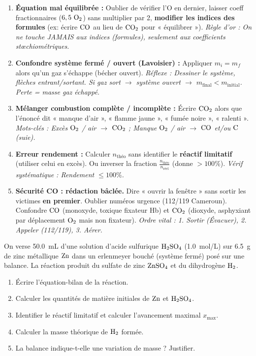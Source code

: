\documentclass[11pt]{article}
\begin{document}
\begin{attention}
\begin{enumerate}
    \item \textbf{Équation mal équilibrée :} Oublier de vérifier l'O en dernier, laisser coeff fractionnaires ($6,5~\ce{O2}$) sans multiplier par 2, \textbf{modifier les indices des formules} (ex: écrire $\ce{CO}$ au lieu de $\ce{CO2}$ pour « équilibrer »). \textit{Règle d'or : On ne touche JAMAIS aux indices (formules), seulement aux coefficients stœchiométriques.}
    \item \textbf{Confondre système fermé / ouvert (Lavoisier) :} Appliquer $m_i = m_f$ alors qu'un gaz s'échappe (bécher ouvert). \textit{Réflexe : Dessiner le système, flèches entrant/sortant. Si gaz sort $\to$ système ouvert $\to$ $m_{\text{final}} < m_{\text{initial}}$. Perte = masse gaz échappé.}
    \item \textbf{Mélanger combustion complète / incomplète :} Écrire $\ce{CO2}$ alors que l'énoncé dit « manque d'air », « flamme jaune », « fumée noire », « ralenti ». \textit{Mots-clés : Excès $\ce{O2}$ / air $\to$ $\ce{CO2}$ ; Manque $\ce{O2}$ / air $\to$ $\ce{CO}$ et/ou $\ce{C}$ (suie).}
    \item \textbf{Erreur rendement :} Calculer $n_{\text{théo}}$ sans identifier le \textbf{réactif limitatif} (utiliser celui en excès). Ou inverser la fraction $\frac{n_{\text{théo}}}{n_{\text{réel}}}$ (donne $>100\%$). \textit{Vérif systématique : Rendement $\le 100\%$.}
    \item \textbf{Sécurité CO : rédaction bâclée.} Dire « ouvrir la fenêtre » sans sortir les victimes \textbf{en premier}. Oublier numéros urgence (112/119 Cameroun). Confondre $\ce{CO}$ (monoxyde, toxique fixateur Hb) et $\ce{CO2}$ (dioxyde, asphyxiant par déplacement $\ce{O2}$ mais non fixateur). \textit{Ordre vital : 1. Sortir (Évacuer), 2. Appeler (112/119), 3. Aérer.}
\end{enumerate}
\end{attention}

\begin{exercice}
On verse \SI{50,0}{mL} d'une solution d'acide sulfurique $\ce{H2SO4}$ (\SI{1,0}{mol/L}) sur \SI{6,5}{g} de zinc métallique $\ce{Zn}$ dans un erlenmeyer bouché (système fermé) posé sur une balance. La réaction produit du sulfate de zinc $\ce{ZnSO4}$ et du dihydrogène $\ce{H2}$.
\begin{enumerate}
    \item Écrire l'équation-bilan de la réaction.
    \item Calculer les quantités de matière initiales de $\ce{Zn}$ et $\ce{H2SO4}$.
    \item Identifier le réactif limitatif et calculer l'avancement maximal $x_{\max}$.
    \item Calculer la masse théorique de $\ce{H2}$ formée.
    \item La balance indique-t-elle une variation de masse ? Justifier.
\end{enumerate}
\end{exercice}
\end{document}
